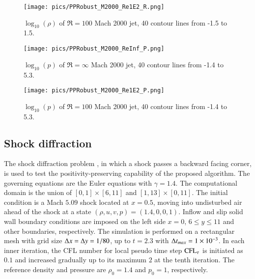 \begin{figure}[htbp]
    \centering
    \texttt{[image: pics/PPRobust\_M2000\_Re1E2\_R.png]}
    \caption{$\log_{10}(\rho)$ of $\Re=100$ Mach 2000 jet, 40 contour lines from -1.5 to 1.5.}
    \label{fig:M2000_Re1E2_R}
\end{figure}

\begin{figure}[htbp]
    \centering
    \texttt{[image: pics/PPRobust\_M2000\_ReInf\_P.png]}
    \caption{$\log_{10}(p)$ of $\Re=\infty$ Mach 2000 jet, 40 contour lines from -1.4 to 5.3.}
    \label{fig:M2000_ReInf_P}
\end{figure}

\begin{figure}[htbp]
    \centering
    \texttt{[image: pics/PPRobust\_M2000\_Re1E2\_P.png]}
    \caption{$\log_{10}(p)$ of $\Re=100$ Mach 2000 jet, 40 contour lines from -1.4 to 5.3.}
    \label{fig:M2000_Re1E2_P}
\end{figure}

\subsection{Shock diffraction}

The shock diffraction problem \cite{zhang2010positivity}, in which a shock passes a backward facing corner,
is used to test the positivity-preserving capability of the proposed algorithm.
The governing equations are the Euler equations with $\gamma = 1.4$.
The computational domain is the union of $[0,1]\times[6,11]$ and $[1,13]\times[0,11]$.
The initial condition is a Mach $5.09$ shock located at $x=0.5$,
moving into undisturbed air ahead of the shock at a state $(\rho, u, v, p)=(1.4,0,0,1)$.
Inflow and slip solid wall boundary conditions are imposed on
the left side $x = 0$, $6\leq y \leq 11$ and other boundaries, respectively.
The simulation is performed on a rectangular mesh with grid size $\mathrm\Delta x = \mathrm\Delta y = 1/80$,
up to $t=2.3$ with $\mathrm\Delta t_{max}=1\times 10^{-3}$.
In each inner iteration, the CFL number for local pseudo time step $\text{CFL}_\tau$ is initiated as $0.1$
and increased gradually up to its maximum $2$ at the tenth iteration.
The reference density and pressure are $\rho_0=1.4$ and $p_0=1$, respectively.


